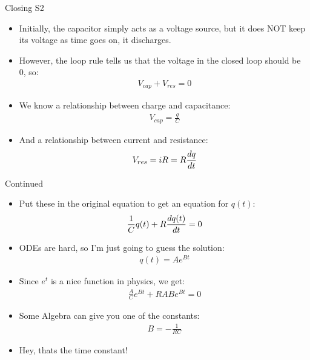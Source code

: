 \documentclass{beamer}
\begin{document}
\begin{frame}{Closing S2}
  \begin{itemize}
  \item Initially, the capacitor simply acts as a voltage source, but it does NOT keep its voltage as time goes on, it discharges.
  \item However, the loop rule tells us that the voltage in the closed loop should be 0, so:
    \begin{align*}
      V_{cap}+V_{res}=0
    \end{align*}
  \item We know a relationship between charge and capacitance:
    \begin{align*}
      V_{cap}=\frac{q}{C}
    \end{align*}
  \item And a relationship between current and resistance:
    \begin{align*}
      V_{res}=iR=R\dv{q}{t}
    \end{align*}
  \end{itemize}
\end{frame}
\begin{frame}{Continued}
  \begin{itemize}
  \item Put these in the original equation to get an equation for $q(t)$:
    \begin{align*}
      \frac{1}{C}q(t)+R\dv{q(t)}{t}=0
    \end{align*}
  \item ODEs are hard, so I'm just going to guess the solution:
    \begin{align*}
      q(t)=Ae^{Bt}
    \end{align*}
  \item Since $e^t$ is a nice function in physics, we get:
    \begin{align*}
      \frac{A}{C}e^{Bt}+RABe^{Bt}=0
    \end{align*}
  \item Some Algebra can give you one of the constants:
    \begin{align*}
      B=-\frac{1}{RC}
    \end{align*}
  \item Hey, thats the time constant!
  \end{itemize}
\end{frame}
\end{document}

